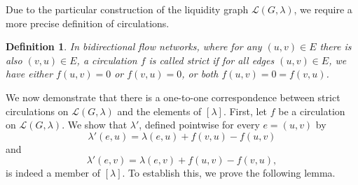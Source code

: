 \documentclass[10pt,twocolumn]{article}
\newtheorem{definition}{Definition}[section]
\newtheorem{lemma}[theorem]{Lemma}
\begin{document}

Due to the particular construction of the liquidity graph \(\mathcal{L}(G,\lambda)\), we require a more precise definition of circulations.

\begin{definition}
  In bidirectional flow networks, where for any \((u,v) \in E\) there is also \((v,u) \in E\), a circulation \(f\) is called strict if for all edges \((u,v) \in E\), we have either \(f(u,v) = 0\) or \(f(v,u) = 0\), or both \(f(u,v) = 0 = f(v,u)\).
\end{definition}

We now demonstrate that there is a one-to-one correspondence between strict circulations on \(\mathcal{L}(G,\lambda)\) and the elements of \([\lambda]\).  
First, let \(f\) be a circulation on \(\mathcal{L}(G,\lambda)\).  
We show that \(\lambda'\), defined pointwise for every \(e = (u,v)\) by
\begin{equation}
  \lambda'(e,u) = \lambda(e,u) + f(v,u) - f(u,v)
\end{equation}
and
\begin{equation}
  \lambda'(e,v) = \lambda(e,v) + f(u,v) - f(v,u),
\end{equation}
is indeed a member of \([\lambda]\).  
To establish this, we prove the following lemma.
\end{document}
